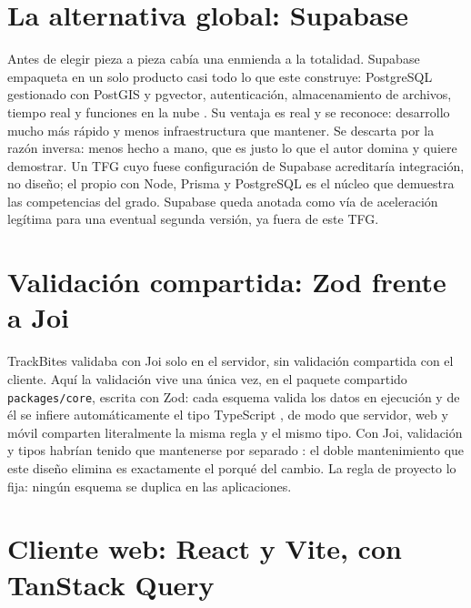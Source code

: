 \section{La alternativa global: Supabase}
\label{sec:alt-supabase}

Antes de elegir pieza a pieza cabía una enmienda a la totalidad.
Supabase empaqueta en un solo producto casi todo lo que este  construye: PostgreSQL gestionado con PostGIS y pgvector, autenticación, almacenamiento de archivos, tiempo real y funciones en la nube \parencite{supabase-docs}.
Su ventaja es real y se reconoce: desarrollo mucho más rápido y menos infraestructura que mantener.
Se descarta por la razón inversa: menos  hecho a mano, que es justo lo que el autor domina y quiere demostrar.
Un \ac{TFG} cuyo  fuese configuración de Supabase acreditaría integración, no diseño; el  propio con Node, Prisma y PostgreSQL es el núcleo que demuestra las competencias del grado.
Supabase queda anotada como vía de aceleración legítima para una eventual segunda versión, ya fuera de este \ac{TFG}.

\section{Validación compartida: Zod frente a Joi}
\label{sec:alt-validacion}

TrackBites validaba con Joi solo en el servidor, sin validación compartida con el cliente.
Aquí la validación vive una única vez, en el paquete compartido \texttt{packages/core}, escrita con Zod: cada esquema valida los datos en ejecución y de él se infiere automáticamente el tipo TypeScript \parencite{zod-docs}, de modo que servidor, web y móvil comparten literalmente la misma regla y el mismo tipo.
Con Joi, validación y tipos habrían tenido que mantenerse por separado \parencite{joi-docs}: el doble mantenimiento que este diseño elimina es exactamente el porqué del cambio.
La regla de proyecto lo fija: ningún esquema se duplica en las aplicaciones.

\section{Cliente web: React y Vite, con TanStack Query}
\label{sec:alt-web}

